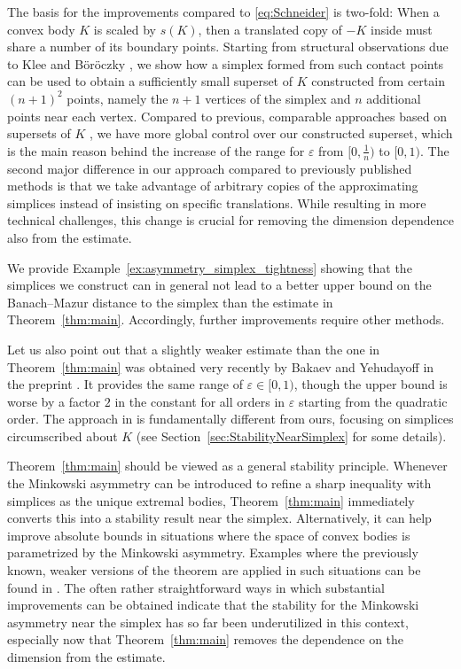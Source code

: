 \documentclass{amsart}
\begin{document}
The basis for the improvements compared to \eqref{eq:Schneider} is two-fold:
When a convex body $K$ is scaled by $s(K)$, then a translated copy of $-K$ inside must share a number of its boundary points.
Starting from structural observations due to Klee \cite{1953:Klee} and Böröczky \cite{2005:Böröczky}, we show how a simplex formed from such contact points can be used to obtain a sufficiently small superset of $K$ constructed from certain $(n+1)^2$ points, 
namely the $n+1$ vertices of the simplex and $n$ additional points near each vertex.
Compared to previous, comparable approaches based on supersets of $K$ \cite{2005:Böröczky},
we have more global control over our constructed superset,
which is the main reason behind the increase of the range for $\varepsilon$ from $[0,\frac{1}{n})$ to $[0,1)$.
The second major difference in our approach compared to previously published methods is that we take advantage of arbitrary copies of the approximating simplices instead of insisting on specific translations.
While resulting in more technical challenges, this change is crucial for removing the dimension dependence also from the estimate.

We provide Example~\ref{ex:asymmetry_simplex_tightness} showing that the simplices we construct can in general not lead to a better upper bound on the Banach--Mazur distance to the simplex than the estimate in Theorem~\ref{thm:main}.
Accordingly, further improvements require other methods.

Let us also point out that a slightly weaker estimate than the one in
Theorem~\ref{thm:main} was obtained very recently by Bakaev and Yehudayoff in the preprint \cite{2026:BakaevYehudayoff}.
It provides the same range of $\varepsilon \in [0,1)$,
though the upper bound is worse by a factor $2$ in the constant for all orders in $\varepsilon$ starting from the quadratic order.
The approach in \cite{2026:BakaevYehudayoff} is fundamentally different from ours, focusing on simplices circumscribed about $K$ (see Section~\ref{sec:StabilityNearSimplex} for some details).

Theorem~\ref{thm:main} should be viewed as a general stability principle.
Whenever the Minkowski asymmetry can be introduced to refine a sharp inequality with simplices as the unique extremal bodies,
Theorem~\ref{thm:main} immediately converts this into a stability result near the simplex.
Alternatively, it can help improve absolute bounds in situations where the space of convex bodies is parametrized by the Minkowski asymmetry.
Examples where the previously known, weaker versions of the theorem are applied in such situations can be found in \cite{2005:Böröczky,2023:BrandenbergDichterGonzalezMerino,2026:CaDiGoGrJaRu,2021:LianWu,2009:Schneider}.
The often rather straightforward ways in which substantial improvements can be obtained indicate that the stability for the Minkowski asymmetry near the simplex has so far been underutilized in this context,
especially now that Theorem~\ref{thm:main} removes the dependence on the dimension from the estimate.
\end{document}
